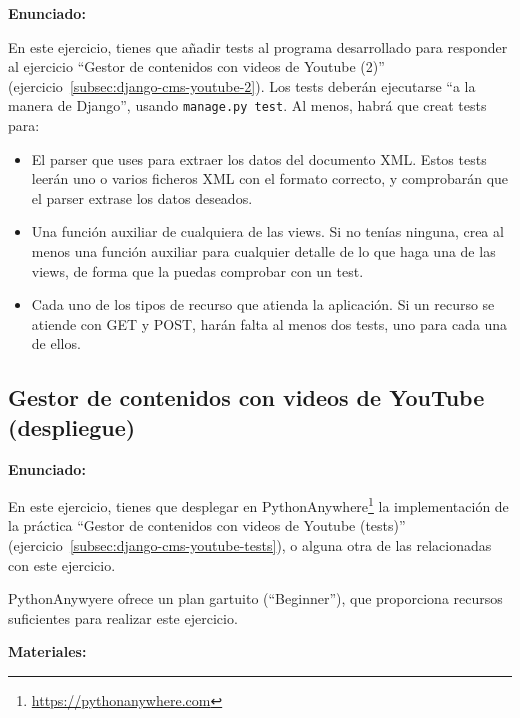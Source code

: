 \textbf{Enunciado:}

En este ejercicio, tienes que añadir tests al programa desarrollado para responder al ejercicio  ``Gestor de contenidos con videos de Youtube (2)'' (ejercicio~\ref{subsec:django-cms-youtube-2}). Los tests deberán ejecutarse ``a la manera de Django'', usando \verb|manage.py test|. Al menos, habrá que creat tests para:

\begin{itemize}
\item El parser que uses para extraer los datos del documento XML. Estos tests leerán uno o varios ficheros XML con el formato correcto, y comprobarán que el parser extrase los datos deseados.
\item Una función auxiliar de cualquiera de las views. Si no tenías ninguna, crea al menos una función auxiliar para cualquier detalle de lo que haga una de las views, de forma que la puedas comprobar con un test.
\item Cada uno de los tipos de recurso que atienda la aplicación. Si un recurso se atiende con GET y POST, harán falta al menos dos tests, uno para cada una de ellos.
\end{itemize}

\subsection{Gestor de contenidos con videos de YouTube (despliegue)}
\label{subsec:django-cms-youtube-despliegue}

\textbf{Enunciado:}

En este ejercicio, tienes que desplegar en PythonAnywhere\footnote{\url{https://pythonanywhere.com}} la implementación de la práctica  ``Gestor de contenidos con videos de Youtube (tests)'' (ejercicio~\ref{subsec:django-cms-youtube-tests}), o alguna otra de las relacionadas con este ejercicio.

PythonAnywyere ofrece un plan gartuito (``Beginner''), que proporciona recursos suficientes para realizar este ejercicio.

\textbf{Materiales:}


